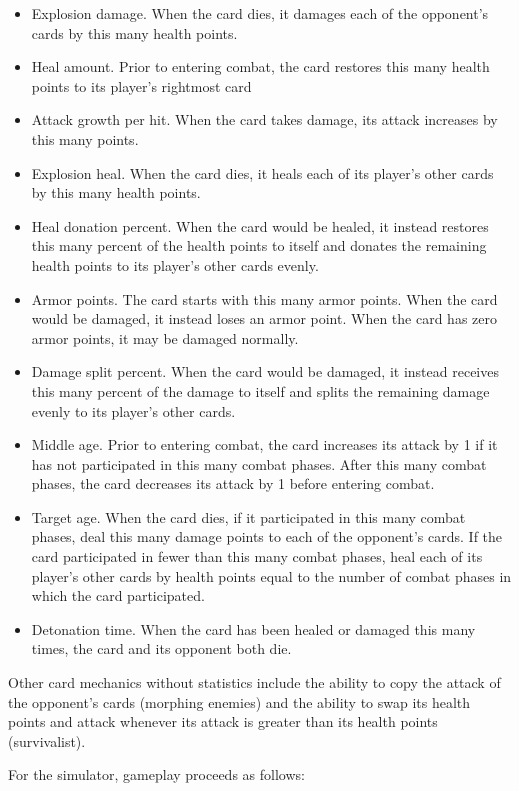 \begin{itemize}
	\item Explosion damage. When the card dies, it damages
	each of the opponent's cards by this many health points.
	\item Heal amount. Prior to entering combat, the card 
	restores this many health points to its player's rightmost
	card
	\item Attack growth per hit. When the card takes damage, its
	attack increases by this many points.
	\item Explosion heal. When the card dies, it heals
	each of its player's other cards by this many health points.
	\item Heal donation percent. When the card would be healed,
	it instead restores this many percent of the health points
	to itself and donates the remaining health points to its
	player's other cards evenly.
	\item Armor points. The card starts with this many armor points.
	When the card would be damaged, it instead loses an armor point.
	When the card has zero armor points, it may be damaged normally.
	\item Damage split percent. When the card would be damaged,
	it instead receives this many percent of the damage to itself
	and splits the remaining damage evenly to its player's other cards.
	\item Middle age. Prior to entering combat, the card increases its
	attack by 1 if it has not participated in this many combat phases.
	After this many combat phases, the card decreases its attack by 1
	before entering combat.
	\item Target age. When the card dies, if it participated in this many
	combat phases, deal this many damage points to each of the opponent's
	cards. If the card participated in fewer than this many combat phases, 
	heal each of its player's other cards by health points equal to the
	number of combat phases in which the card participated.
	\item Detonation time. When the card has been healed or damaged this
	many times, the card and its opponent both die.
\end{itemize}

Other card mechanics without statistics include the ability to copy the 
attack of the opponent's cards (morphing enemies) and the ability to swap 
its health points and attack whenever its attack is greater than its health 
points (survivalist).

For the simulator, gameplay proceeds as follows:

